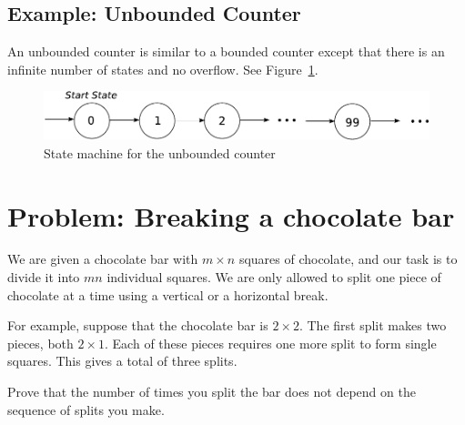 \documentclass[12pt]{article}
\begin{document}
{\subsection{Example: Unbounded Counter}

An unbounded counter is similar to a bounded counter except that there
is an infinite number of states and no overflow. See
Figure~\ref{unbounded}.

\begin{figure}
\begin{center}
\includegraphics[scale = 0.6, trim = 0in 9in 0in 0in, clip]{unbounded}
\end{center}
\caption{State machine for the unbounded counter}
\label{unbounded}
\end{figure}
}

\section{Problem: Breaking a chocolate bar}

We are given a chocolate bar with $m \times n$ squares of
chocolate, and our task is to divide it into $mn$ individual squares.  We
are only allowed to split one piece of chocolate at a time using a
vertical or a horizontal break.

For example, suppose that the chocolate bar is $2 \times 2$.  The
first split makes two pieces, both $2 \times 1$.  Each of these pieces
requires one more split to form single squares.  This gives a total of
three splits.

Prove that the number of times you split the bar does not depend on the sequence of splits you make.
\end{document}

